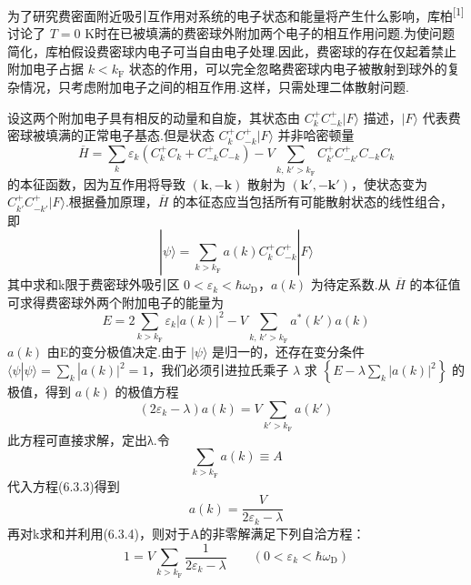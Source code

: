为了研究费密面附近吸引互作用对系统的电子状态和能量将产生什么影响，库柏\textsuperscript{[1]}讨论了 $T=0$ K时在已被填满的费密球外附加两个电子的相互作用问题.为使问题简化，库柏假设费密球内电子可当自由电子处理.因此，费密球的存在仅起着禁止附加电子占据 $k<k_{\mathrm{F}}$ 状态的作用，可以完全忽略费密球内电子被散射到球外的复杂情况，只考虑附加电子之间的相互作用.这样，只需处理二体散射问题.

设这两个附加电子具有相反的动量和自旋，其状态由 $C^{+}_{k}C^{+}_{-k}|F\rangle$ 描述，$|F\rangle$ 代表费密球被填满的正常电子基态.但是状态 $C^{+}_{k}C^{+}_{-k}|F\rangle$ 并非哈密顿量
\begin{equation*}
  \overline{H}=\sum_{k}\varepsilon_{k}\left(C^{+}_{k}C_{k}+C^{+}_{-k}C_{-k}\right)
  -V\sum_{k,\,k'>k_{\mathrm{F}}}C^{+}_{k'}C^{+}_{-k'}C_{-k}C_{k}
\end{equation*}
的本征函数，因为互作用将导致 $(\boldsymbol{k},-\boldsymbol{k})$ 散射为 $(\boldsymbol{k}',-\boldsymbol{k}')$，使状态变为 $C^{+}_{k'}C^{+}_{-k'}|F\rangle$.根据叠加原理，$\overline{H}$ 的本征态应当包括所有可能散射状态的线性组合，即
\begin{equation}
  |\psi\rangle=\sum_{k>k_{\mathrm{F}}}a(k)C^{+}_{k}C^{+}_{-k}|F\rangle
\end{equation}
其中求和k限于费密球外吸引区 $0<\varepsilon_{k}<\hbar\omega_{\mathrm{D}}$，$a(k)$ 为待定系数.从 $\overline{H}$ 的本征值可求得费密球外两个附加电子的能量为
\begin{equation}
  E=2\sum_{k>k_{\mathrm{F}}}\varepsilon_{k}|a(k)|^{2}
  -V\sum_{k,\,k'>k_{\mathrm{F}}}a^{*}(k')a(k)
\end{equation}
$a(k)$ 由E的变分极值决定.由于 $|\psi\rangle$ 是归一的，还存在变分条件 $\langle\psi|\psi\rangle=\sum_{k}|a(k)|^{2}=1$，我们必须引进拉氏乘子 $\lambda$ 求 $\left\{E-\lambda\sum_{k}|a(k)|^{2}\right\}$ 的极值，得到 $a(k)$ 的极值方程
\begin{equation}
  \left(2\varepsilon_{k}-\lambda\right)a(k)=V\sum_{k'>k_{\mathrm{F}}}a(k')
\end{equation}
此方程可直接求解，定出λ.令
\begin{equation}
  \sum_{k>k_{\mathrm{F}}}a(k)\equiv A
\end{equation}
代入方程(6.3.3)得到
\begin{equation}
  a(k)=\frac{V}{2\varepsilon_{k}-\lambda}
\end{equation}
再对k求和并利用(6.3.4)，则对于A的非零解满足下列自洽方程：
\begin{equation}
  1=V\sum_{k>k_{\mathrm{F}}}\frac{1}{2\varepsilon_{k}-\lambda}
  \qquad(0<\varepsilon_{k}<\hbar\omega_{\mathrm{D}})
\end{equation}
